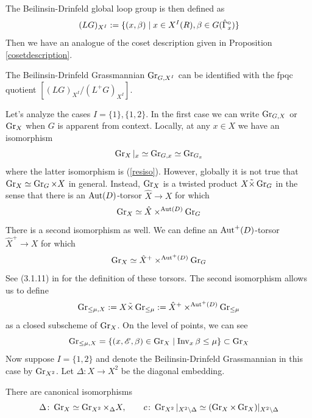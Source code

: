 \documentclass[12pt]{article}
\begin{document}
The Beilinsin-Drinfeld global loop group is then defined as
\[(LG)_{X^I} := \{(x, \beta) \mid x \in X^I(R), \beta \in G(\hat{\Gamma}^{\mathrm{o}}_x)\}\]
Then we have an analogue of the coset description given in Proposition \ref{cosetdescription}.
\begin{prop}
    The Beilinsin-Drinfeld Grassmannian $\operatorname{Gr}_{G,X^I}$ can be identified with the fpqc quotient $[(LG)_{X^I} / (L^+G)_{X^I}]$.
\end{prop}
Let's analyze the cases $I = \{1\}, \{1,2\}$. In the first case we can write $\operatorname{Gr}_{G,X}$ or $\operatorname{Gr}_X$ when $G$ is apparent from context. Locally, at any $x \in X$ we have an isomorphism
\[\operatorname{Gr}_X \vert_x \simeq \operatorname{Gr}_{G,x} \simeq \operatorname{Gr}_{G_x}\]
where the latter isomorphism is (\ref{resiso}). However, globally it is not true that $\operatorname{Gr}_X \simeq \operatorname{Gr}_{G} \times X$ in general. Instead, $\operatorname{Gr}_X$ is a twisted product $X \tilde{\times} \operatorname{Gr}_G$ in the sense that there is an $\operatorname{Aut}(D)$-torsor $\hat{X} \to X$ for which 
\[\operatorname{Gr}_X \simeq \hat{X} \times^{\operatorname{Aut}(D)} \operatorname{Gr}_G\]
There is a second isomorphism as well. We can define an $\operatorname{Aut}^+(D)$-torsor $\hat{X}^+ \to X$ for which 
\[\operatorname{Gr}_X \simeq \hat{X}^+ \times^{\operatorname{Aut}^+(D)} \operatorname{Gr}_G\]
See (3.1.11) in \cite{Zhu2016} for the definition of these torsors. The second isomorphism allows us to define
\[\operatorname{Gr}_{\leq \mu, X} := X \tilde{\times} \operatorname{Gr}_{\leq \mu} := \hat{X}^+ \times^{\operatorname{Aut}^+(D)} \operatorname{Gr}_{\leq \mu}\]
as a closed subscheme of $\operatorname{Gr}_X$. On the level of points, we can see
\[\operatorname{Gr}_{\leq \mu, X} = \{(x,\mathscr{E}, \beta) \in \operatorname{Gr}_X \mid \operatorname{Inv}_x \beta \leq \mu\} \subset \operatorname{Gr}_X\]
Now suppose $I = \{1,2\}$ and denote the Beilinsin-Drinfeld Grassmannian in this case by $\operatorname{Gr}_{X^2}$. Let $\Delta \colon X \to X^2$ be the diagonal embedding. 
\begin{prop}\label{factorX2}
    There are canonical isomorphisms
    \[\Delta \colon \operatorname{Gr}_X \simeq \operatorname{Gr}_{X^2} \times_{\Delta} X, \qquad c\colon \operatorname{Gr}_{X^2} \vert_{X^2 \setminus \Delta} \simeq (\operatorname{Gr}_X \times \operatorname{Gr}_X)\vert_{X^2 \setminus \Delta}\]
\end{prop}
\end{document}
